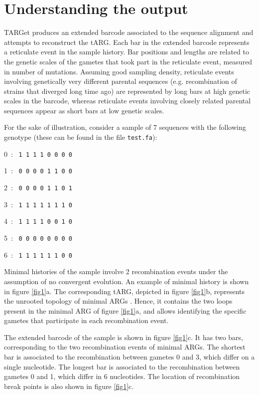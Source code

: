 \documentclass[12pt]{article}
\begin{document}
\section{Understanding the output}

TARGet produces an extended barcode associated to the sequence alignment and attempts to reconstruct the tARG. Each bar in the extended barcode represents a reticulate event in the sample history. Bar positions and lengths are related to the genetic scales of the gametes that took part in the reticulate event, measured in number of mutations. Assuming good sampling density, reticulate events involving genetically very different parental sequences (e.g. recombination of strains that diverged long time ago) are represented by long bars at high genetic scales in the barcode, whereas reticulate events involving closely related parental sequences appear as short bars at low genetic scales.

For the sake of illustration, consider a sample of 7 sequences with the following genotype (these can be found in the file \texttt{test.fa}):

0\ : \ \texttt{1 1 1 1 0 0 0 0}

1\ : \ \texttt{0 0 0 0 1 1 0 0}

2\ : \ \texttt{0 0 0 0 1 1 0 1}

3\ : \ \texttt{1 1 1 1 1 1 1 0}

4\ : \ \texttt{1 1 1 1 0 0 1 0}

5\ : \ \texttt{0 0 0 0 0 0 0 0}

6\ : \ \texttt{1 1 1 1 1 1 0 0}

\noindent Minimal histories of the sample involve 2 recombination events under the assumption of no convergent evolution. An example of minimal history is shown in figure \ref{fig1}a. The corresponding tARG, depicted in figure \ref{fig1}b, represents the unrooted topology of minimal ARGs \cite{target}. Hence, it contains the two loops present in the minimal ARG of figure \ref{fig1}a, and allows identifying the specific gametes that participate in each recombination event. 

The extended barcode of the sample is shown in figure \ref{fig1}c. It has two bars, corresponding to the two recombination events of minimal ARGs. The shortest bar is associated to the recombination between gametes 0 and 3, which differ on a single nucleotide. The longest bar is associated to the recombination between gametes 0 and 1, which differ in 6 nucleotides. The location of recombination break points is also shown in figure \ref{fig1}c.
\end{document}
